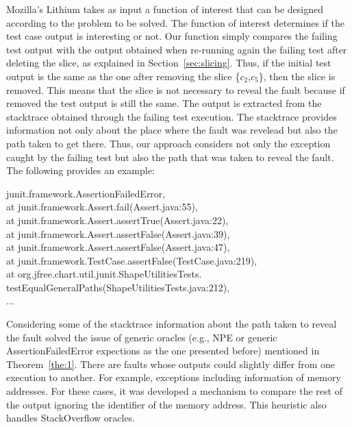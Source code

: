 \documentclass{article}
\begin{document}
Mozilla's Lithium takes as input a function of interest that can be designed according to the problem to be solved. The function of interest determines if the test case output is interesting or not. Our function simply compares the failing test output with the output obtained when re-running again the failing test after deleting the slice, as explained in Section~\ref{sec:slicing}. Thus, if the
initial test output is the same as the one after removing the slice \{$c_2$,$c_5$\}, then the slice is removed. This means that the slice is not necessary to reveal the fault because if removed the test output is still the same.
The output is extracted from the stacktrace obtained through the failing test execution. The stacktrace provides information not only about the place where the fault was revelead but also the path taken to get there. Thus, our approach considers not only the exception caught by the failing test but also the path that was taken to reveal the fault. The following provides an example:

\vspace{3mm}
\begin{myframe} \label{box:1}
junit.framework.AssertionFailedError, \\
at junit.framework.Assert.fail(Assert.java:55), \\
at junit.framework.Assert.assertTrue(Assert.java:22), \\
at junit.framework.Assert.assertFalse(Assert.java:39), \\
at junit.framework.Assert.assertFalse(Assert.java:47), \\
at junit.framework.TestCase.assertFalse(TestCase.java:219), \\
at org.jfree.chart.util.junit.ShapeUtilitiesTests.\\testEqualGeneralPaths(ShapeUtilitiesTests.java:212), \\
...
\end{myframe}

Considering some of the stacktrace information about the path taken to reveal the fault solved the issue of generic oracles (e.g., NPE or generic AssertionFailedError expections as the one presented before) mentioned in Theorem~\ref{the:1}. There are faults whose outputs could slightly differ from one execution to another. For example, exceptions including information of memory addresses. For these cases, it was developed a mechanism to compare the rest of the output ignoring the identifier of the memory address. This heuristic also handles StackOverflow oracles.
\end{document}
